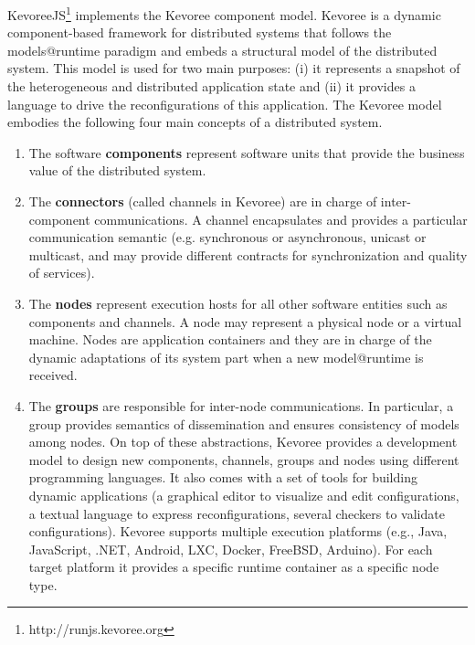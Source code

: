 KevoreeJS\footnote{http://runjs.kevoree.org} implements the Kevoree component model. Kevoree is a dynamic component-based framework for distributed systems that follows the models@runtime paradigm and embeds a structural model of the distributed system. This model is used for two main purposes: (i) it represents a snapshot of the heterogeneous and distributed application state and (ii) it provides a language to drive the reconfigurations of this application. The Kevoree model embodies the following four main concepts of a distributed system.

\begin{enumerate}
	\item The software \textbf{components} represent software units that provide the business value of the distributed system.
\item The \textbf{connectors} (called channels in Kevoree) are in charge of inter-component communications. A channel encapsulates and provides a particular communication semantic (e.g. synchronous or asynchronous, unicast or multicast, and may provide different contracts for synchronization and quality of services).
\item The \textbf{nodes} represent execution hosts for all other software entities such as components and channels. A node may represent a physical node or a virtual machine. Nodes are application containers and they are in charge of the dynamic adaptations of its system part when a new model@runtime is received.
\item The \textbf{groups} are responsible for inter-node communications. In particular, a group provides semantics of dissemination and ensures consistency of models among nodes. On top of these abstractions, Kevoree provides a development model to design new components, channels, groups and nodes using different programming languages. It also comes with a set of tools for building dynamic applications (a graphical editor to visualize and edit configurations, a textual language to express reconfigurations, several checkers to validate configurations). Kevoree supports multiple execution platforms (e.g., Java, JavaScript, .NET, Android, LXC, Docker, FreeBSD, Arduino). For each target platform it provides a specific runtime container as a specific node type.

\end{enumerate}


